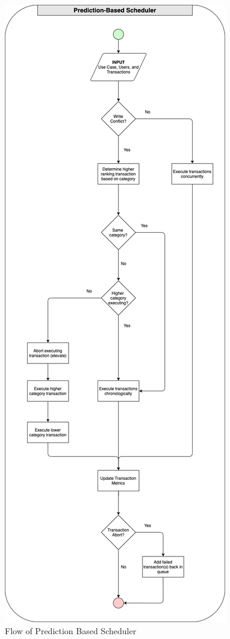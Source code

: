 \begin{figure}
\centering
\includegraphics[scale=0.28]{images/PBSScheduler.png}
\caption{Flow of Prediction Based Scheduler}
\label{image:flow_of_pbs}
\end{figure}